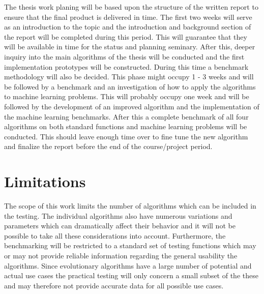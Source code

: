 \documentclass[12pt, titlepage, a4paper]{article}
\begin{document}
The thesis work planing will be based upon the structure of the written report to ensure that the final product is delivered in time. The first two weeks will serve as an introduction to the topic and the introduction and background section of the report will be completed during this period. This will guarantee that they will be available in time for the status and planning seminary. After this, deeper inquiry into the main algorithms of the thesis will be conducted and the first implementation prototypes will be constructed. During this time a benchmark methodology will also be decided. This phase might occupy 1 - 3 weeks and will be followed by a benchmark and an investigation of how to apply the algorithms to machine learning problems. This will probably occupy one week and will be followed by the development of an improved algorithm and the implementation of the machine learning benchmarks. After this a complete benchmark of all four algorithms on both standard functions and machine learning problems will be conducted. This should leave enough time over to fine tune the new algorithm and finalize the report before the end of the course/project period.

\section{Limitations}

The scope of this work limits the number of algorithms which can be included in the testing. The individual algorithms also have numerous variations and parameters which can dramatically affect their behavior and it will not be possible to take all these considerations into account. Furthermore, the benchmarking will be restricted to a standard set of testing functions which may or may not provide reliable information regarding the general usability the algorithms. Since evolutionary algorithms have a large number of potential and actual use cases the practical testing will only concern a small subset of the these and may therefore not provide accurate data for all possible use cases.

\newpage


\end{document}

